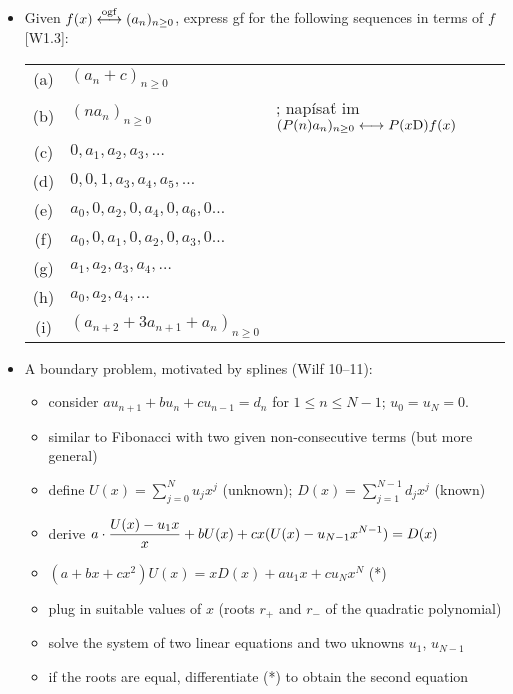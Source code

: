 \documentclass[10pt, a4paper]{article}
\def\ans#1{\big[\hskip 2mm {#1}\hskip 2mm\big]}
\def\ogf{\overset{{\rm ogf}}{\longleftrightarrow}}
\def\xD{x{\rm D}}
\begin{document}
\begin{itemize}

\item 
Given $f(x)\ogf (a_n)_{n\ge 0}$, express gf for the following sequences in terms of $f$ [W1.3]:\\
\setlength\extrarowheight{1mm}
\begin{tabular}{cl@{\hskip 5mm}l}
    (a) & $(a_n+c)_{n\ge 0}$ & \ans{$f(x)+c/(1-x)$}\\
    (b) & $(na_n)_{n\ge 0}$ & \ans{$\xD f(x)$}; \qquad napísať im $(P(n)a_n)_{n\ge 0} \longleftrightarrow P(\xD)f(x)$\\
    (c) & $0, a_1, a_2, a_3, \dots$ & \ans{$f(x)-a_0$}\\
    (d) & $0, 0, 1, a_3, a_4, a_5,\dots$ & \ans{$f(x)-a_0-a_1x+(1-a_2)x^2$}\\
    (e) & $a_0, 0, a_2, 0, a_4, 0, a_6, 0\dots$ & \ans{$(f(x)+f(-x))/2$}\\
    (f) & $a_0, 0, a_1, 0, a_2, 0, a_3, 0\dots$ & \ans{$f(x^2)$}\\
    (g) & $a_1, a_2, a_3, a_4,\dots$ & \ans{$(f(x)-a_0)/x$}\\
    (h) & $a_0, a_2, a_4, \dots$ & \ans{$(f(\sqrt{x})+f(-\sqrt{x}))/2$}\\
    (i) & $(a_{n+2}+3a_{n+1}+a_n)_{n\ge 0}$ & \ans{$(f-a_0-a_1x)/x^2 + 3(f-a_0)/x + f$}\\
\end{tabular}

\item 
A boundary problem, motivated by splines (Wilf 10--11):
\begin{itemize}
    \item consider $au_{n+1}+bu_n+cu_{n-1}=d_n$ for $1\le n\le N-1$; $u_0=u_N=0$.
    \item similar to Fibonacci with two given non-consecutive terms (but more general)
    \item define $U(x)= \sum_{j=0}^N u_jx^j$ (unknown); $D(x)=\sum_{j=1}^{N-1} d_jx^j$ (known)
    \item derive $\displaystyle a\cdot {U(x)-u_1x\over x}+bU(x)+cx(U(x)-u_{N-1}x^{N-1}) = D(x)$
    \item $(a+bx+cx^2) U(x) = x D(x)  +au_1x + cu_Nx^N$ (*)
    \item plug in suitable values of $x$ (roots $r_{+}$ and $r_{-}$ of the quadratic polynomial)
    \item solve the system of two linear equations and two uknowns $u_1$, $u_{N-1}$
    \item if the roots are equal, differentiate (*) to obtain the second equation
\end{itemize}


\end{itemize}
\end{document}
